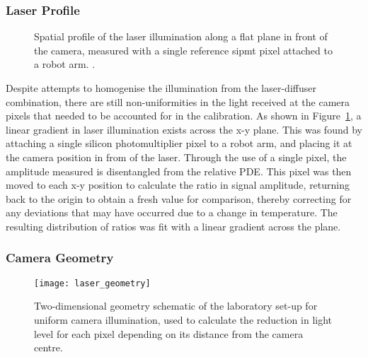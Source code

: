 \subsubsection{Laser Profile}

\begin{figure}
	\centering
	\caption[Lab laser profile]{Spatial profile of the laser illumination along a flat plane in front of the camera, measured with a single reference \gls{sipmt} pixel attached to a robot arm. .}
	\label{fig:light_profile}
\end{figure}

Despite attempts to homogenise the illumination from the laser-diffuser combination, there are still non-uniformities in the light received at the camera pixels that needed to be accounted for in the calibration. As shown in Figure~\ref{fig:light_profile}, a linear gradient in laser illumination exists across the x-y plane. This was found by attaching a single silicon photomultiplier pixel to a robot arm, and placing it at the camera position in from of the laser. Through the use of a single pixel, the amplitude measured is disentangled from the relative PDE. This pixel was then moved to each x-y position to calculate the ratio in signal amplitude, returning back to the origin to obtain a fresh value for comparison, thereby correcting for any deviations that may have occurred due to a change in temperature. The resulting distribution of ratios was fit with a linear gradient across the plane.

\subsubsection{Camera Geometry}

\begin{figure}
	\centering
    \texttt{[image: laser\_geometry]} 
	\caption[Camera geometry correction schematic]{Two-dimensional geometry schematic of the laboratory set-up for uniform camera illumination, used to calculate the reduction in light level for each pixel depending on its distance from the camera centre.}
	\label{fig:laser_geometry}
\end{figure}


